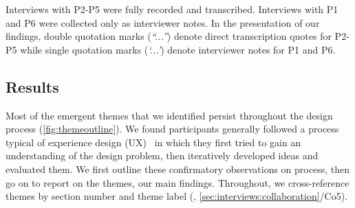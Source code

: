 Interviews with P2-P5 were fully recorded and transcribed. Interviews with P1 and P6 were collected only as interviewer notes. In the presentation of %
our findings, double quotation marks (\textit{``...''}) denote direct transcription quotes for P2-P5 while single quotation marks (\textit{`...'}) denote interviewer notes for P1 and P6. %


\subsection{Results}
\label{sec:interviews:process}
%
\noindent
Most of the emergent themes  that we identified persist throughout the design process (\autoref{fig:themeoutline}). %
We found participants generally followed a process typical of experience design (UX)~\citep{Buxton2007} %
in which they first tried to gain an understanding of the design problem, then iteratively developed ideas and evaluated them.
We first outline these confirmatory observations on process, then go on to  report on the themes, our main findings.
Throughout, we cross-reference themes by section number and theme label (\eg, \ref{sec:interviews:collaboration}/Co5).



